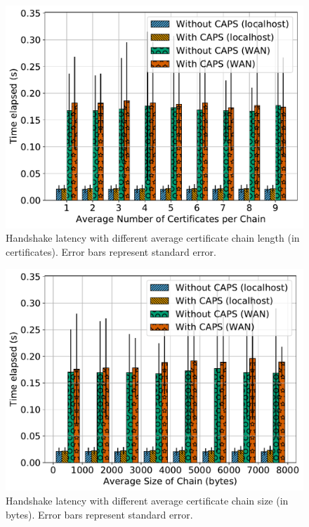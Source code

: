 \begin{figure}[t]
  \centering
  \includegraphics[width=\linewidth]{fig/eval_tls_ext/2-time_elapsed_vs_num_certs_per_chain}
  \caption{Handshake latency with different average certificate chain length (in
  certificates). Error bars represent standard error.}
  \label{fig:evaltlsext:numcert}
\end{figure}

\begin{figure}[t]
  \centering
  \includegraphics[width=\linewidth]{fig/eval_tls_ext/3-time_elapsed_vs_avg_chain_size}
  \caption{Handshake latency with different average certificate chain size (in
  bytes). Error bars represent standard error.}
  \label{fig:evaltlsext:sizechain}
\end{figure}

